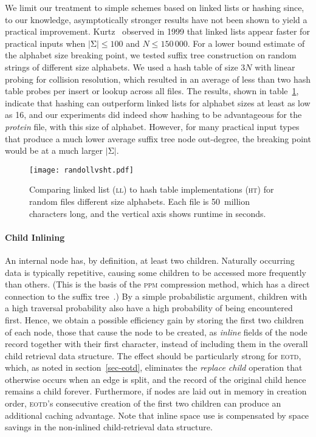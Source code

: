 \documentclass{llncs}
\newcommand\alphabet{{\mathrm{\Sigma}}}
\newcommand\eotd{\textsc{eotd}\xspace}
\newcommand\lili{\textsc{ll}\xspace}
\newcommand\hata{\textsc{ht}\xspace}
\begin{document}
We limit our treatment to simple schemes based on  linked lists or
hashing since, to our knowledge, asymptotically stronger results have not been shown to
yield a practical improvement. Kurtz~\cite{kurtzsuftree}
observed in 1999 that linked lists appear faster for practical inputs when
$|\alphabet|\leq 100$ and $N\leq 150\,000$. For a lower bound estimate of the
alphabet size breaking point, we tested suffix tree construction on random
strings of different size alphabets. We used a hash table of size $3N$ with linear probing
for collision resolution, which resulted
in an average of less than two hash table probes per insert or lookup
across all files. The results, shown in
table~\ref{fig-hashvsll}, indicate that hashing can outperform linked lists for
alphabet sizes at least as low as 16, and our experiments did indeed show hashing to be
advantageous for the \emph{protein} file, with this size of alphabet. However,
for many practical input types that produce a much lower average suffix tree
node out-degree, the breaking point would be at a much larger $|\alphabet|$.


\begin{figure}[t]
  \begin{center}
\texttt{[image: randollvsht.pdf]}
\end{center}
\vspace{-10mm}
\caption{\label{fig-hashvsll} Comparing linked list (\lili) to hash table
  implementations (\hata) for random files
  different size alphabets. Each file is 50~million characters long, and
  the vertical axis shows runtime in seconds.}
\end{figure}

\label{sec-inlining}

\paragraph*{Child Inlining}

An internal node has, by definition, at least two children. Naturally occurring
data is typically repetitive, causing some children to be accessed more
frequently than others. (This is the basis of the \textsc{ppm} compression
method, which has a direct connection to the suffix tree~\cite{SufComp}.) By
a simple probabilistic argument, children with a high traversal probability
also have a high probability of being encountered first. Hence, we
obtain a possible efficiency gain by storing the first two children of each
node, those that cause the node to be created, as \emph{inline} fields of the
node record together with their first character, instead of including them in
the overall child retrieval data structure. The effect should be particularly strong for \eotd, which, as
noted in section~\ref{sec-eotd}, eliminates the \emph{replace child}
operation that otherwise occurs when an edge is split, and the record
of the original child hence remains a child forever.  Furthermore, if nodes are
laid out in memory in creation order, \eotd's
consecutive creation of the first two children can
produce an additional caching advantage. Note that inline space use is compensated by space
savings in the non-inlined child-retrieval data structure.
\end{document}

